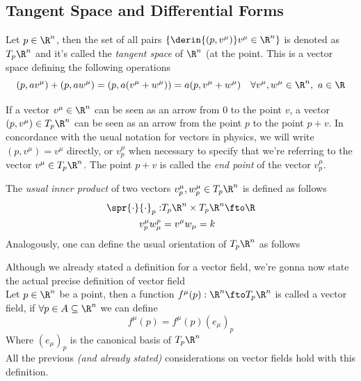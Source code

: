 \documentclass[../mmf.tex]{subfiles}
\begin{document}
\subsection{Tangent Space and Differential Forms}
\begin{dfn}
	Let $p\in\R^n$, then the set of all pairs $\{\derin{(p,v^\mu)}v^\mu\in\R^n\}$ is denoted as $T_{p}\R^n$ and it's called the \textit{tangent space} of $\R^n$ (at the point. This is a vector space defining the following operations
	\begin{equation*}
		(p,av^\mu)+(p,aw^\mu)=\left(p,a(v^\mu+w^\mu)\right)=a(p,v^\mu+w^\mu)\quad\forall v^\mu,w^\mu\in\R^n,\ a\in\R
	\end{equation*}
\end{dfn}
\begin{rmk}
	If a vector $v^\mu\in\R^n$ can be seen as an arrow from $0$ to the point $v$, a vector $(p,v^\mu)\in T_p\R^n$ can be seen as an arrow from the point $p$ to the point $p+v$. In concordance with the usual notation for vectors in physics, we will write $(p,v^\mu)=v^\mu$ directly, or $v^\mu_p$ when necessary to specify that we're referring to the vector $v^\mu\in T_p\R^n$. The point $p+v$ is called the \textit{end point} of the vector $v^\mu_p$.
\end{rmk}
\begin{dfn}
	The \textit{usual inner product} of two vectors $v^\mu_p,w^\mu_p\in T_p\R^n$ is defined as follows
	\begin{equation}
		\begin{aligned}
			\spr{\cdot}{\cdot}_p:&T_p\R^n\times T_p\R^n\fto\R\\
			v^\mu_pw_\mu^p&=v^\mu w_\mu=k
		\end{aligned}
		\label{eq:tanscalarprod}
	\end{equation}
	Analogously, one can define the usual orientation of $T_p\R^n$ as follows
	\begin{equation*}
		[(e^{\mu_1})_p,\cdots,(e^{\mu_n})_p]
	\end{equation*}
\end{dfn}
\begin{dfn}
	Although we already stated a definition for a vector field, we're gonna now state the actual precise definition of vector field\\
	Let $p\in\R^n$ be a point, then a function $f^\mu(p):\R^n\fto T_p\R^n$ is called a vector field, if $\forall p\in A\subseteq\R^n$ we can define
	\begin{equation}
		f^\mu(p)=f^\mu(p)(e_\mu)_p
		\label{eq:correctvectorfield}
	\end{equation}
	Where $(e_\mu)_p$ is the canonical basis of $T_p\R^n$\\
	All the previous \textit{(and already stated)} considerations on vector fields hold with this definition.
\end{dfn}
\end{document}
